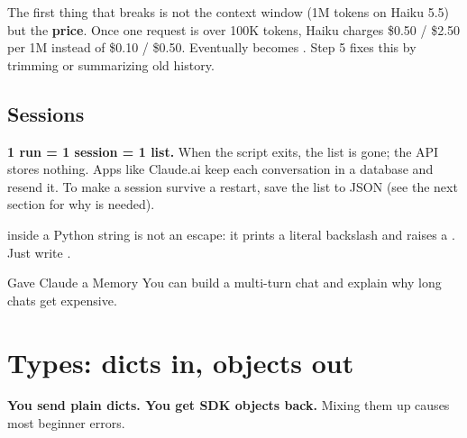 \begin{trap}
The first thing that breaks is not the context window (1M tokens on Haiku 5.5) but the
\textbf{price}. Once one request is over 100K tokens, Haiku charges \$0.50 / \$2.50 per 1M instead of
\$0.10 / \$0.50. Eventually  becomes . Step 5
fixes this by trimming or summarizing old history.
\end{trap}

\subsection{Sessions}

\textbf{1 run = 1 session = 1 list.} When the script exits, the list is gone; the API stores
nothing. Apps like Claude.ai keep each conversation in a database and resend it. To make a session
survive a restart, save the list to JSON (see the next section for why  is needed).

\begin{trap}
 inside a Python string is not an escape: it prints a literal backslash and raises a
. Just write \code{\$}.
\end{trap}

\begin{achievement}{Gave Claude a Memory}
You can build a multi-turn chat and explain why long chats get expensive.
\end{achievement}

\section{Types: dicts in, objects out}

\begin{keyidea}
\textbf{You send plain dicts. You get SDK objects back.} Mixing them up causes most beginner errors.
\end{keyidea}

